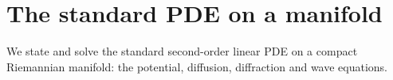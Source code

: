 \section{The standard PDE on a manifold}

We state and solve the standard second-order linear PDE on a compact
Riemannian manifold: the potential, diffusion, diffraction and wave
equations.

\newcommand{\R}{\mathbf{R}}
\newcommand{\Z}{\mathbf{Z}}

%
%
%
%
%
%
%
%
%
%
%
%
%


